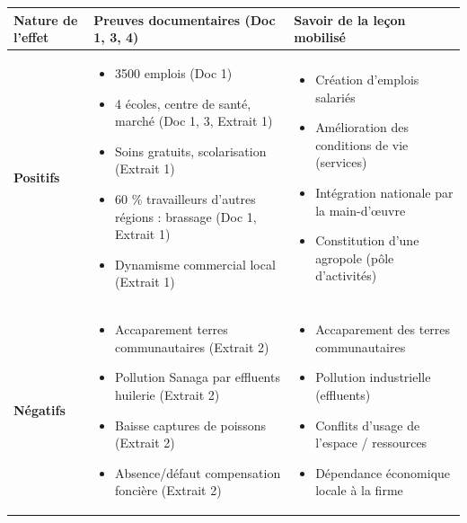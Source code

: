 \documentclass[11pt]{article}
\newcommand{\cle}[1]{{\popxbold\color{popdark}#1}}
\begin{document}
\begin{exoresolu}
\begin{center}
\begin{tabularx}{\linewidth}{|>{\bfseries}l|X|X|}
\hline
\rowcolor{popblueL} \textbf{Nature de l'effet} & \textbf{Preuves documentaires (Doc 1, 3, 4)} & \textbf{Savoir de la leçon mobilisé} \\
\hline
\textbf{Positifs} & 
\begin{itemize}
\item \num{3500} emplois (Doc 1)
\item 4 écoles, centre de santé, marché (Doc 1, 3, Extrait 1)
\item Soins gratuits, scolarisation (Extrait 1)
\item 60 \% travailleurs d'autres régions : brassage (Doc 1, Extrait 1)
\item Dynamisme commercial local (Extrait 1)
\end{itemize}
& 
\begin{itemize}
\item Création d'emplois salariés
\item Amélioration des conditions de vie (services)
\item \cle{Intégration nationale} par la main-d'œuvre
\item Constitution d'une \cle{agropole} (pôle d'activités)
\end{itemize}
\\ \hline
\textbf{Négatifs} & 
\begin{itemize}
\item Accaparement terres communautaires (Extrait 2)
\item Pollution Sanaga par effluents huilerie (Extrait 2)
\item Baisse captures de poissons (Extrait 2)
\item Absence/défaut compensation foncière (Extrait 2)
\end{itemize}
& 
\begin{itemize}
\item \cle{Accaparement des terres} communautaires
\item Pollution industrielle (effluents)
\item Conflits d'usage de l'espace / ressources
\item Dépendance économique locale à la firme
\end{itemize}
\\ \hline
\end{tabularx}
\end{center}


\end{exoresolu}
\end{document}
